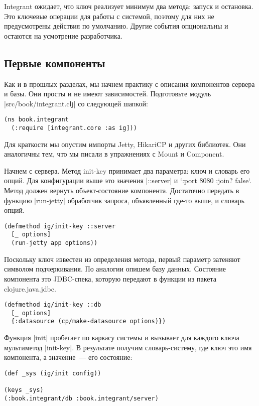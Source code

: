 Integrant ожидает, что ключ реализует минимум два метода: запуск и
остановка. Это ключевые операции для работы с системой, поэтому для них не
предусмотрены действия по умолчанию. Другие события опциональны и остаются на
усмотрение разработчика.

\subsection{Первые компоненты}

Как и в прошлых разделах, мы начнем практику с описания компонентов сервера и
базы. Они просты и не имеют зависимостей. Подготовьте модуль
\spverb|src/book/integrant.clj| со следующей шапкой:

\begin{verbatim}
(ns book.integrant
  (:require [integrant.core :as ig]))
\end{verbatim}

Для краткости мы опустим импорты Jetty, HikariCP и других библиотек. Они
аналогичны тем, что мы писали в упражнениях с Mount и Component.

Начнем с сервера. Метод init-key принимает два параметра: ключ и словарь его
опций. Для конфигурации выше это значения \spverb|::server| и `{:port 8080 :join?
false}`. Метод должен вернуть объект-состояние компонента. Достаточно передать в
функцию \spverb|run-jetty| обработчик запроса, объявленный где-то выше, и словарь
опций.

\begin{verbatim}
(defmethod ig/init-key ::server
  [_ options]
  (run-jetty app options))
\end{verbatim}

Поскольку ключ известен из определения метода, первый параметр затеняют символом
подчеркивания. По аналогии опишем базу данных. Состояние компонента это
JDBC-спека, которую передают в функции из пакета clojure.java.jdbc.

\begin{verbatim}
(defmethod ig/init-key ::db
  [_ options]
  {:datasource (cp/make-datasource options)})
\end{verbatim}

Функция \spverb|init| пробегает по каркасу системы и вызывает для каждого ключа
мультиметод \spverb|init-key|. В результате получим словарь-систему, где ключ это имя
компонента, а значение~--- его состояние:

\begin{verbatim}
(def _sys (ig/init config))

(keys _sys)
(:book.integrant/db :book.integrant/server)
\end{verbatim}

